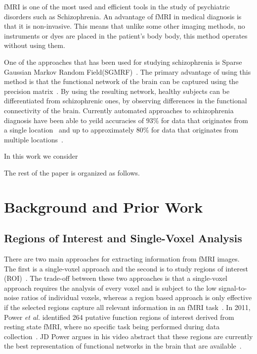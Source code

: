 \documentclass{article} %
\begin{document}
fMRI is one of the most used and efficient tools in the study of 
psychiatric disorders such as Schizophrenia\cite{}. An advantage of fMRI in
medical diagnosis is that it is non-invasive. This means that unlike some 
other imaging methods, no instruments or dyes are placed in the patient’s body
body, this method operates without using them\cite{}. 

One of the approaches that has been used for studying schizophrenia is 
Sparse Gaussian Markov Random Field(SGMRF)~\cite{Rish_2013}\cite{Rosa_2013}. 
The primary advantage of using this method is that the functional network of 
the brain can be captured using the precision matrix~\cite{Rish_2013}.
By using the resulting network, healthy subjects can be differentiated from 
schizophrenic ones, by observing differences in the functional connectivity 
of the brain. Currently automated approaches to schizophrenia
diagnosis have been able to yeild accuracies of $93\%$ for data that 
originates from a single location~\cite{Rish_2013} and up to approximately 
$80\%$ for data that originates from multiple locations~\cite{Cheng2015}.

In this work we consider

The rest of the paper is organized as follows.


\section{Background and Prior Work}

\subsection{Regions of Interest and Single-Voxel Analysis}
There are two main approaches for extracting
information from fMRI images. The first is a single-voxel approach and 
the second is to study regions of interest (ROI)~\cite{heller2006cluster}. 
The trade-off between these two approaches is that a single-voxel approach
requires the analysis of every voxel and is subject to the low signal-to-noise 
ratios of individual voxels, whereas a region based approach is only
effective if the selected regions capture all relevant information in an fMRI 
task~\cite{heller2006cluster}. In 2011, Power \emph{et al.} identified 264 
putative function regions of interest derived from resting state fMRI, where 
no specific task being performed during data collection~\cite{Power_2011}. 
JD Power argues in his video abstract that these regions are currently the
best representation of functional networks in the brain that are
available~\cite{Power_2011}.
\end{document}

